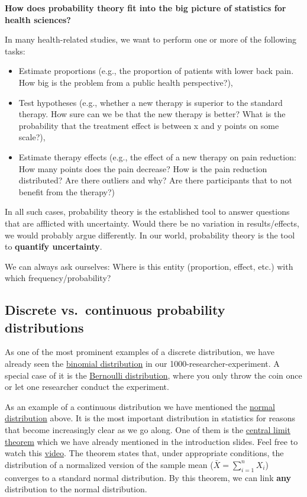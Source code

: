 \documentclass[
]{book}
\providecommand{\tightlist}{%
  \setlength{\itemsep}{0pt}\setlength{\parskip}{0pt}}
\begin{document}
\textbf{How does probability theory fit into the big picture of statistics for health sciences?}

In many health-related studies, we want to perform one or more of the following tasks:

\begin{itemize}
\tightlist
\item
  Estimate proportions (e.g., the proportion of patients with lower back pain. How big is the problem from a public health perspective?),
\item
  Test hypotheses (e.g., whether a new therapy is superior to the standard therapy. How sure can we be that the new therapy is better?
  What is the probability that the treatment effect is between x and y points on some scale?),
\item
  Estimate therapy effects (e.g., the effect of a new therapy on pain reduction:
  How many points does the pain decrease? How is the pain reduction distributed?
  Are there outliers and why? Are there participants that to not benefit from the therapy?)
\end{itemize}

In all such cases, probability theory is the established tool to answer questions that are afflicted with uncertainty. Would there be no variation in results/effects,
we would probably argue differently. In our world, probability theory is the tool to \textbf{quantify uncertainty}.

We can always ask ourselves: Where is this entity (proportion, effect, etc.) with which frequency/probability?

\subsection{Discrete vs.~continuous probability distributions}\label{discrete_vs_continuous_probability_distributions}

As one of the most prominent examples of a discrete distribution, we have already seen
the \href{https://en.wikipedia.org/wiki/Binomial_distribution}{binomial distribution} in our 1000-researcher-experiment.
A special case of it is the \href{https://en.wikipedia.org/wiki/Bernoulli_distribution}{Bernoulli distribution},
where you only throw the coin once or let one researcher conduct the experiment.

As an example of a continuous distribution we have mentioned the \href{https://en.wikipedia.org/wiki/Normal_distribution}{normal distribution} above.
It is the most important distribution in statistics for reasons that become increasingly clear as we go along.
One of them is the \href{https://en.wikipedia.org/wiki/Central_limit_theorem}{central limit theorem} which we have already mentioned in the
introduction slides. Feel free to watch this \href{https://www.youtube.com/watch?v=zeJD6dqJ5lo&t=28s&ab_channel=3Blue1Brown}{video}.
The theorem states that, under appropriate conditions, the distribution of a normalized version of the sample
mean (\(\bar{X} = \sum_{i=1}^{n} X_i\)) converges to a standard normal distribution.
By this theorem, we can link \textbf{any} distribution to the normal distribution.
\end{document}
